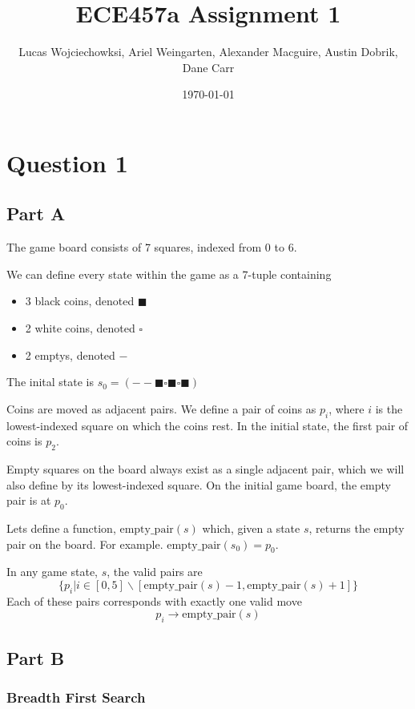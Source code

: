 \documentclass[a4paper]{article}
\title{ECE457a Assignment 1}
\author{Lucas Wojciechowksi, Ariel Weingarten, Alexander Macguire, Austin Dobrik, Dane Carr}
\date{\today}
\newcommand{\coinblack}{\blacksquare}
\newcommand{\coinwhite}{\square}
\newcommand{\coinempty}{-}
\begin{document}
\maketitle

\section{Question 1}

\subsection{Part A}

The game board consists of 7 squares, indexed from 0 to 6.

We can define every state within the game as a 7-tuple containing
\begin{itemize}
\item 3 black coins, denoted $\coinblack$
\item 2 white coins, denoted $\coinwhite$
\item 2 emptys, denoted $\coinempty$
\end{itemize}
The inital state is $s_0 = (\coinempty \coinempty \coinblack \coinwhite \coinblack \coinwhite \coinblack)$

Coins are moved as adjacent pairs. We define a pair of coins as $p_i$, where $i$ is the lowest-indexed square on which the coins rest. In the initial state, the first pair of coins is $p_2$.

Empty squares on the board always exist as a single adjacent pair, which we will also define by its lowest-indexed square. On the initial game board, the empty pair is at $p_0$.

Lets define a function, $\text{empty\_pair}(s)$ which, given a state $s$, returns the empty pair on the board. For example. $\text{empty\_pair}(s_0) = p_0$.

In any game state, $s$, the valid pairs are
$$\{p_i | i \in [0, 5] \backslash [\text{empty\_pair}(s) - 1, \text{empty\_pair}(s) + 1]\}$$
Each of these pairs corresponds with exactly one valid move
$$p_i \rightarrow \text{empty\_pair}(s)$$



\subsection{Part B}

\subsubsection{Breadth First Search}
\end{document}
